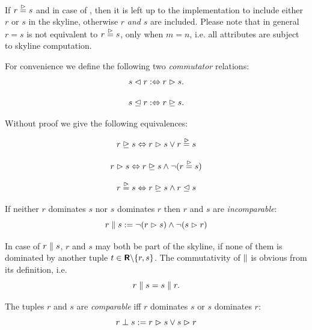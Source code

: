 \noindent
If $r \stackrel{\vartriangleright}{=} s$ and in case of , then it
is left up to the implementation to include either $r$ or $s$ in the
skyline, otherwise $r$ \emph{and} $s$ are included.
%
Please note that in general $r=s$ is not equivalent to $r \stackrel{\vartriangleright}{=} s$,
only when $m = n$, i.e. all attributes are subject to skyline computation.

\bigskip
\noindent
For convenience we define the following two \emph{commutator} relations:
\[
s \vartriangleleft r :\Leftrightarrow r \vartriangleright s.
\]

\[
s \trianglelefteq r :\Leftrightarrow r \trianglerighteq s.
\]

\pagebreak[3]
\noindent
Without proof we give the following equivalences:

\begin{equation}\label{eqn:weakdominats-dom-nondistinct}
r \trianglerighteq s \Leftrightarrow r \vartriangleright s \lor r \stackrel{\vartriangleright}{=} s
\end{equation}

\begin{equation}
r \vartriangleright s \Leftrightarrow r \trianglerighteq s \land \neg (r \stackrel{\vartriangleright}{=} s)
\end{equation}

\begin{equation}
r \stackrel{\vartriangleright}{=} s \Leftrightarrow r \trianglerighteq s \land r \trianglelefteq s
\end{equation}



\begin{definition}[Incomparable] If neither $r$ dominates $s$ nor $s$ dominates $r$ then $r$ and $s$ are \emph{incomparable}:
\[
r \parallel s := \neg (r \vartriangleright s) \land \neg (s \vartriangleright r)
\]
\end{definition}

\noindent
In case of $r \parallel s$, $r$ and $s$ may both be part of the
skyline, if none of them is dominated by another tuple $t \in
\textnormal{\bf\textsf{R}} \backslash \{r, s\}$.
%
The commutativity of $\parallel$ is obvious from its definition, i.e.
\[
r \parallel s = s \parallel r.
\]


\begin{definition}[Comparable]The tuples $r$ and $s$ are \emph{comparable} iff $r$ dominates $s$ or $s$ dominates $r$:
\[
r \perp s := r \vartriangleright s \lor s \vartriangleright r
\]
\end{definition}

